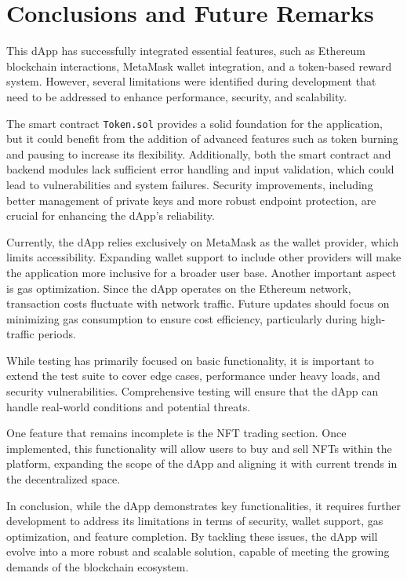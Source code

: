 \documentclass[../main.tex]{subfiles}
\begin{document}
\section{Conclusions and Future Remarks}\label{sec:conclusions}
This dApp has successfully integrated essential features, such as Ethereum blockchain interactions, MetaMask wallet integration, and a token-based reward system. However, several limitations were identified during development that need to be addressed to enhance performance, security, and scalability.

The smart contract \texttt{Token.sol} provides a solid foundation for the application, but it could benefit from the addition of advanced features such as token burning and pausing to increase its flexibility. Additionally, both the smart contract and backend modules lack sufficient error handling and input validation, which could lead to vulnerabilities and system failures. Security improvements, including better management of private keys and more robust endpoint protection, are crucial for enhancing the dApp’s reliability.

Currently, the dApp relies exclusively on MetaMask as the wallet provider, which limits accessibility. Expanding wallet support to include other providers will make the application more inclusive for a broader user base. Another important aspect is gas optimization. Since the dApp operates on the Ethereum network, transaction costs fluctuate with network traffic. Future updates should focus on minimizing gas consumption to ensure cost efficiency, particularly during high-traffic periods.

While testing has primarily focused on basic functionality, it is important to extend the test suite to cover edge cases, performance under heavy loads, and security vulnerabilities. Comprehensive testing will ensure that the dApp can handle real-world conditions and potential threats.

One feature that remains incomplete is the NFT trading section. Once implemented, this functionality will allow users to buy and sell NFTs within the platform, expanding the scope of the dApp and aligning it with current trends in the decentralized space.

In conclusion, while the dApp demonstrates key functionalities, it requires further development to address its limitations in terms of security, wallet support, gas optimization, and feature completion. By tackling these issues, the dApp will evolve into a more robust and scalable solution, capable of meeting the growing demands of the blockchain ecosystem.
\end{document}
